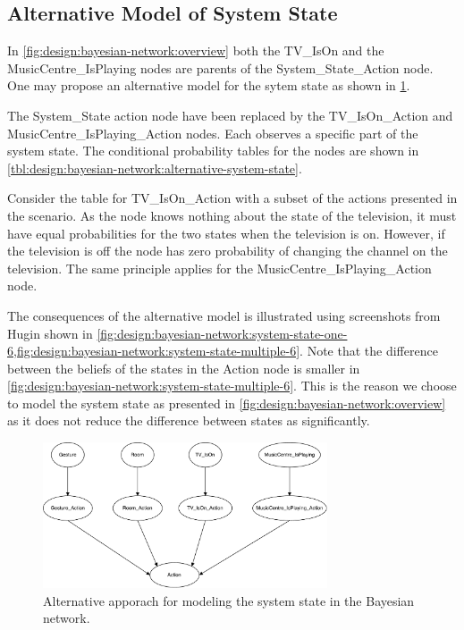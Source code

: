\subsection{Alternative Model of System State}

In \cref{fig:design:bayesian-network:overview} both the TV\_IsOn and the MusicCentre\_IsPlaying nodes are parents of the System\_State\_Action node. One may propose an alternative model for the sytem state as shown in \cref{fig:design:bayesian-network:alternative-network}.

The System\_State action node have been replaced by the TV\_IsOn\_Action and MusicCentre\_IsPlaying\_Action nodes. Each observes a specific part of the system state. The conditional probability tables for the nodes are shown in \cref{tbl:design:bayesian-network:alternative-system-state}.

Consider the table for TV\_IsOn\_Action with a subset of the actions presented in the scenario. As the node knows nothing about the state of the television, it must have equal probabilities for the two states when the television is on. However, if the television is off the node has zero probability of changing the channel on the television. The same principle applies for the MusicCentre\_IsPlaying\_Action node.

The consequences of the alternative model is illustrated using screenshots from Hugin shown in \cref{fig:design:bayesian-network:system-state-one-6,fig:design:bayesian-network:system-state-multiple-6}. Note that the difference between the beliefs of the states in the Action node is smaller in \cref{fig:design:bayesian-network:system-state-multiple-6}. This is the reason we choose to model the system state as presented in \cref{fig:design:bayesian-network:overview} as it does not reduce the difference between states as significantly.

\begin{figure}[h!]
\centering
\includegraphics[width=0.75\textwidth]{images/bayesian-network-split-system-state}
\caption{Alternative apporach for modeling the system state in the Bayesian network.}
\label{fig:design:bayesian-network:alternative-network}
\end{figure}

